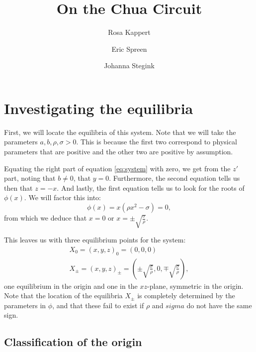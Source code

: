 \message{ !name(chua_circuit.tex)}\documentclass[twocolumn,10pt]{article}
\title{On the Chua Circuit}
\author{Rosa Kappert \and Eric Spreen \and Johanna Stegink}
\begin{document}
\section{Investigating the equilibria}

First, we will locate the equilibria of this system.  Note that we
will take the parameters $a, b, \rho,\sigma > 0$.  This is because the
first two correspond to physical parameters that are positive and the
other two are positive by assumption.

Equating the right part of equation \ref{eq:system} with zero, we get
from the $z'$ part, noting that $b \neq 0$, that $y = 0$.
Furthermore, the second equation tells us then that $z = -x$.  And
lastly, the first equation tells us to look for the roots of
$\phi(x)$.  We will factor this into:
\begin{equation}
  \label{eq:phi-factor}
  \phi(x) = x ( \rho x^2 - \sigma ) = 0,
\end{equation}
from which we deduce that $x = 0$ or $x = \pm
\sqrt{\frac{\sigma}{\rho}}$.

This leaves us with three equilibrium points for the system:
\begin{gather}
  X_0 = (x,y,z)_0 = (0,0,0)\\
  X_\pm =(x,y,z)_\pm = (\pm\sqrt{\frac{\sigma}{\rho}}, 0,
  \mp\sqrt{\frac{\sigma}{\rho}}),
\end{gather}
one equilibrium in the origin and one in the $xz$-plane, symmetric in
the origin.  Note that the location of the equilibria $X_\pm$ is
completely determined by the parameters in $\phi$, and that these fail
to exist if $\rho$ and $sigma$ do not have the same sign.

\subsection{Classification of the origin}
\end{document}
